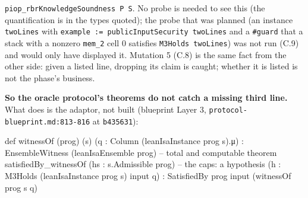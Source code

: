 \texttt{p\allowbreak{}i\allowbreak{}o\allowbreak{}p\allowbreak{}\_\allowbreak{}r\allowbreak{}b\allowbreak{}r\allowbreak{}K\allowbreak{}n\allowbreak{}o\allowbreak{}w\allowbreak{}l\allowbreak{}e\allowbreak{}d\allowbreak{}g\allowbreak{}e\allowbreak{}S\allowbreak{}o\allowbreak{}u\allowbreak{}n\allowbreak{}d\allowbreak{}n\allowbreak{}e\allowbreak{}s\allowbreak{}s\allowbreak{} P\allowbreak{} S}. No probe is needed to see this (the quantification is in the types quoted); the probe that was planned (an instance \texttt{twoLines} with \texttt{e\allowbreak{}x\allowbreak{}a\allowbreak{}m\allowbreak{}p\allowbreak{}l\allowbreak{}e\allowbreak{} :\allowbreak{}=\allowbreak{} p\allowbreak{}u\allowbreak{}b\allowbreak{}l\allowbreak{}i\allowbreak{}c\allowbreak{}I\allowbreak{}n\allowbreak{}p\allowbreak{}u\allowbreak{}t\allowbreak{}S\allowbreak{}e\allowbreak{}c\allowbreak{}u\allowbreak{}r\allowbreak{}i\allowbreak{}t\allowbreak{}y\allowbreak{} t\allowbreak{}w\allowbreak{}o\allowbreak{}L\allowbreak{}i\allowbreak{}n\allowbreak{}e\allowbreak{}s} and a \texttt{\#guard} that a stack with a nonzero \texttt{mem\_\allowbreak{}2} cell 0 satisfies \texttt{M3Holds twoLines}) was not run (C.9) and would only have displayed it. Mutation 5 (C.8) is the same fact from the other side: given a listed line, dropping its claim is caught; whether it is listed is not the phase's business.

\textbf{So the oracle protocol's theorems do not catch a missing third line.} What does is the adaptor, not built (blueprint Layer 3, \texttt{p\allowbreak{}r\allowbreak{}o\allowbreak{}t\allowbreak{}o\allowbreak{}c\allowbreak{}o\allowbreak{}l\allowbreak{}-{}\allowbreak{}b\allowbreak{}l\allowbreak{}u\allowbreak{}e\allowbreak{}p\allowbreak{}r\allowbreak{}i\allowbreak{}n\allowbreak{}t\allowbreak{}.\allowbreak{}m\allowbreak{}d\allowbreak{}:\allowbreak{}8\allowbreak{}1\allowbreak{}3\allowbreak{}-{}\allowbreak{}8\allowbreak{}1\allowbreak{}6} at \texttt{b435631}):

\begin{leancode}
def witnessOf (prog) (s) (q : Column (leanIsaInstance prog s).μ) :
    EnsembleWitness (leanIsaEnsemble prog)                            -- total and computable
theorem satisfiedBy_witnessOf (hs : s.Admissible prog)                 -- the caps: a hypothesis
    (h : M3Holds (leanIsaInstance prog s) input q) : SatisfiedBy prog input (witnessOf prog s q)
\end{leancode}

